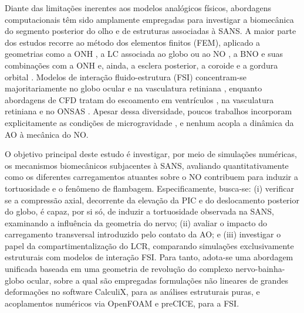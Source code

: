 \documentclass[article, hidelinks,oneside,12pt]{abntex2}
\begin{document}
Diante das limitações inerentes aos modelos analógicos físicos, abordagens computacionais têm sido amplamente empregadas para investigar a biomecânica do segmento posterior do olho e de estruturas associadas à SANS. A maior parte dos estudos recorre ao método dos elementos finitos (FEM), aplicado a geometrias como a ONH \cite{sigal2004, wang2016}, a LC associada ao globo ou ao NO \cite{newson2006, feola2016, sala2023}, a BNO e suas combinações com a ONH \cite{lee2020, islam2024, jafari2025} e, ainda, a esclera posterior, a coroide e a gordura orbital \cite{feola2018, lim2024, reilly2023}. Modelos de interação fluido-estrutura (FSI) concentram-se majoritariamente no globo ocular \cite{furlani, karampelas, maklad} e na vasculatura retiniana \cite{rebhan2019}, enquanto abordagens de CFD tratam do escoamento em ventrículos \cite{holmlund2019}, na vasculatura retiniana \cite{caddy2024} e no ONSAS \cite{namaghi2026}. Apesar dessa diversidade, poucos trabalhos incorporam explicitamente as condições de microgravidade \cite{feola2016, feola2018, lee2020, reilly2023, caddy2024}, e nenhum acopla a dinâmica da AO à mecânica do NO.

O objetivo principal deste estudo é investigar, por meio de simulações numéricas, os mecanismos biomecânicos subjacentes à SANS, avaliando quantitativamente como os diferentes carregamentos atuantes sobre o NO contribuem para induzir a tortuosidade e o fenômeno de flambagem. Especificamente, busca-se: (i) verificar se a compressão axial, decorrente da elevação da PIC e do deslocamento posterior do globo, é capaz, por si só, de induzir a tortuosidade observada na SANS, examinando a influência da geometria do nervo; (ii) avaliar o impacto do carregamento transversal introduzido pelo contato da AO; e (iii) investigar o papel da compartimentalização do LCR, comparando simulações exclusivamente estruturais com modelos de interação FSI. Para tanto, adota-se uma abordagem unificada baseada em uma geometria de revolução do complexo nervo-bainha-globo ocular, sobre a qual são empregadas formulações não lineares de grandes deformações no software CalculiX, para as análises estruturais puras, e acoplamentos numéricos via OpenFOAM e preCICE, para a FSI.

\end{document}
